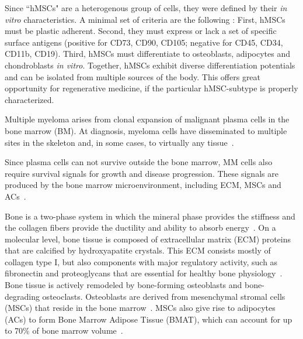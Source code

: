 Since ``hMSCs"
are a heterogenous group of cells, they were defined by their \textit{in
    vitro} characteristics. A minimal set of criteria are the following
\cite{dominiciMinimalCriteriaDefining2006}
: First, hMSCs must be plastic adherent. Second, they
must express or lack a set of specific surface antigens (positive for
CD73, CD90, CD105; negative for CD45, CD34, CD11b, CD19). Third, hMSCs
must differentiate to osteoblasts, adipocytes and chondroblasts
\textit{in vitro}. Together, hMSCs exhibit diverse differentiation
potentials and can be isolated from multiple sources of the body. This
offers great opportunity for regenerative medicine, if the particular
hMSC-subtype is properly characterized.


Multiple myeloma arises from clonal expansion of malignant plasma cells
in the bone marrow (BM). At diagnosis, myeloma cells have disseminated
to multiple sites in the skeleton and, in some cases, to virtually any
tissue~\cite{rajkumarMultipleMyelomaCurrent2020,
    bladeExtramedullaryDiseaseMultiple2022}.


Since plasma cells can not survive outside the bone marrow, MM cells
also require survival signals for growth and disease progression. These
signals are produced by the bone marrow microenvironment, including ECM,
MSCs and ACs~\cite{kiblerAdhesiveInteractionsHuman1998,
    garcia-ortizRoleTumorMicroenvironment2021}.


Bone is a two-phase system in which the mineral phase provides the
stiffness and the collagen fibers provide the ductility and ability to
absorb energy~\cite{viguet-carrinRoleCollagenBone2006}. On a molecular
level, bone tissue is composed of extracellular matrix (ECM) proteins
that are calcified by hydroxyapatite crystals. This ECM consists mostly
of collagen type I, but also components with major regulatory activity,
such as fibronectin and proteoglycans that are essential for healthy
bone physiology~\cite{alcorta-sevillanoDecipheringRelevanceBone2020}.
Bone tissue is actively remodeled by bone-forming osteoblasts and
bone-degrading osteoclasts. Osteoblasts are derived from mesenchymal
stromal cells (MSCs) that reside in the bone marrow~\cite{friedensteinOsteogenesisTransplantsBone1966,
    pittengerMultilineagePotentialAdult1999}. MSCs also give rise to
adipocytes (ACs) to form Bone Marrow Adipose Tissue (BMAT), which can
account for up to 70\% of bone marrow volume~\cite{fazeliMarrowFatBone2013}.

